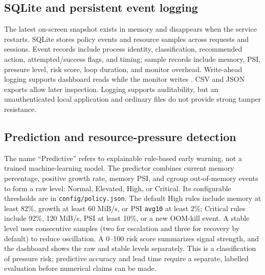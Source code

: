 \documentclass[12pt,a4paper]{article}
\newcommand{\code}[1]{\texttt{#1}}
\begin{document}
\subsection{SQLite and persistent event logging}
The latest on-screen snapshot exists in memory and disappears when the service restarts. SQLite stores policy events and resource samples across requests and sessions. Event records include process identity, classification, recommended action, attempted/success flags, and timing; sample records include memory, PSI, pressure level, risk score, loop duration, and monitor overhead. Write-ahead logging supports dashboard reads while the monitor writes \cite{sqlite-wal}. CSV and JSON exports allow later inspection. Logging supports auditability, but an unauthenticated local application and ordinary files do not provide strong tamper resistance.

\subsection{Prediction and resource-pressure detection}
The name ``Predictive'' refers to explainable rule-based early warning, not a trained machine-learning model. The predictor combines current memory percentage, positive growth rate, memory PSI, and cgroup out-of-memory events to form a raw level: Normal, Elevated, High, or Critical. Its configurable thresholds are in \code{config/policy.json}. The default High rules include memory at least 82\%, growth at least 60 MiB/s, or PSI \code{avg10} at least 2\%; Critical rules include 92\%, 120 MiB/s, PSI at least 10\%, or a new OOM-kill event. A stable level uses consecutive samples (two for escalation and three for recovery by default) to reduce oscillation. A 0--100 risk score summarizes signal strength, and the dashboard shows the raw and stable levels separately. This is a classification of pressure risk; predictive accuracy and lead time require a separate, labelled evaluation before numerical claims can be made.
\end{document}
